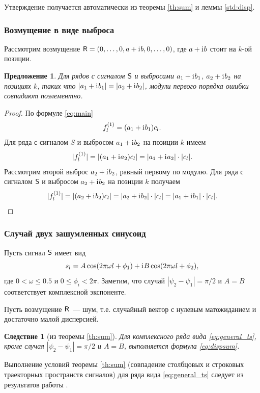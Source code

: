 \documentclass[12pt,a4paper]{article}
\newtheorem{proposition}{Предложение}%
\newtheorem{corollary}{Следствие}%
\begin{document}
Утверждение получается автоматически из теоремы \ref{th:sum} и леммы \ref{std:disp}.

\subsubsection{Возмущение в виде выброса}

Рассмотрим возмущение $\textsf{R} = (0, \ldots, 0, a + \mathrm{i}\mkern1mu b, 0, \ldots, 0)$, где $a + \mathrm{i}\mkern1mu b$ стоит на $k$-ой позиции.

\begin{proposition}\label{st:RMSEinv}
	Для рядов с сигналом $\textsf{S}$ и выбросами $a_1 + \mathrm{i}\mkern1mu b_1$, $a_2 + \mathrm{i}\mkern1mu b_2$ на позициях $k$, таких что $|a_1 + \mathrm{i}\mkern1mu b_1| = |a_2 + \mathrm{i}\mkern1mu b_2|$, модули первого порядка ошибки совпадают поэлементно.
\end{proposition}
\begin{proof}
	По формуле \eqref{eq:main}
	$$f^{(1)}_l = (a_1 + \mathrm{i}\mkern1mu b_1)c_l.$$
	Для ряда с сигналом $S$ и выбросом $a_1 + \mathrm{i}\mkern1mu b_2$ на позиции $k$ имеем
	$$|f^{(1)}_l| = |(a_1 + \mathrm{i}\mkern1mu a_2)c_l| = |a_1 + \mathrm{i}\mkern1mu a_2|\cdot|c_l|. $$
	Рассмотрим второй выброс $a_2 + \mathrm{i}\mkern1mu b_2$, равный первому по модулю.
	Для ряда с сигналом $\textsf{S}$ и выбросом $a_2 + \mathrm{i}\mkern1mu b_2$ на позиции $k$ получаем
	$$|f^{(1)}_l| = |(a_2 + \mathrm{i}\mkern1mu b_2)c_l| = |a_2 + \mathrm{i}\mkern1mu b_2|\cdot|c_l| = |a_1 + \mathrm{i}\mkern1mu b_1|\cdot|c_l|. $$
\end{proof}


\subsubsection{Случай двух зашумленных синусоид}
Пусть сигнал $\textsf{S}$ имеет вид
\begin{equation}
\label{eq:general_ts}
s_l = A\cos(2 \pi\omega l + \phi_1) + \mathrm{i}\mkern1mu B\cos(2 \pi\omega l + \phi_2),
\end{equation}
где $0<\omega\le 0.5$ и $0\le\phi_i < 2\pi$.
Заметим, что случай $|\psi_2-\psi_1| = \pi/2$ и $A=B$ соответствует комплексной экспоненте.

Пусть возмущение $\textsf{R}$~--- шум, т.е. случайный вектор с нулевым матожиданием и достаточно малой дисперсией.

\begin{corollary}[из теоремы {\ref{th:sum}}]
Для комплексного ряда вида \eqref{eq:general_ts}, кроме случая $|\psi_2-\psi_1| = \pi/2$ и $A=B$,  выполняется формула \eqref{eq:dispsum}.
\end{corollary}
Выполнение условий теоремы {\ref{th:sum}} (совпадение столбцовых и строковых траекторных пространств сигналов) для ряда вида \eqref{eq:general_ts} следует из результатов работы \cite{Golyandina.Stepanov2005}.
\end{document}
